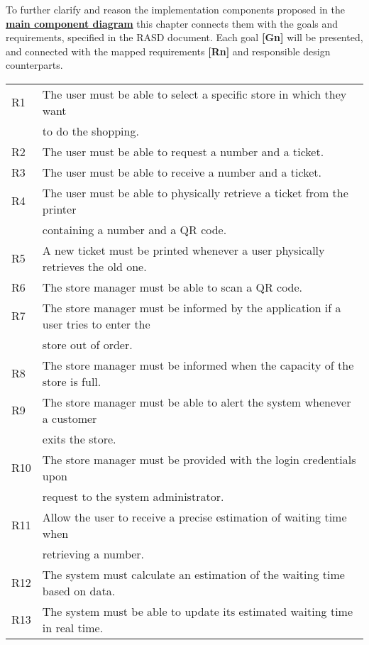 To further clarify and reason the implementation components proposed in the \textbf{\hyperref[fig:componentdiagram1]{main component diagram}} this chapter connects them with the goals and requirements, specified in the RASD document. Each goal \textbf{[Gn]} will be presented, and connected with the mapped requirements \textbf{[Rn]} and responsible design counterparts.\newline


\begin{table}[H]
\begin{flushleft}
\begin{tabular}{|l|l|}
\hline
R1&The user must be able to select a specific store in which they want \\ & to do the shopping.\\
\hline
R2&The user must be able to request a number and a ticket.\\
\hline
R3&The user must be able to receive a number and a ticket. \\
\hline
R4&The user must be able to physically retrieve a ticket from the printer \\   &  containing a number and a QR code.\\
\hline
R5&A new ticket must be printed whenever a user physically retrieves the old one.\\
\hline
R6&The store manager must be able to scan a QR code.\\
\hline
R7&The store manager must be informed by the application if a user tries to enter the \\ & store out of order.\\
\hline
R8&The store manager must be informed when the capacity of the store is full.\\
\hline
R9&The store manager must be able to alert the system whenever a customer \\ & exits the store.\\
\hline
R10&The store manager must be provided with the login credentials upon \\ & request to the system administrator.\\
\hline
R11&Allow the user to receive a precise estimation of waiting time when \\ &  retrieving a number.\\
\hline
R12&The system must calculate an estimation of the waiting time based on data.\\
\hline
R13&The system must be able to update its estimated waiting time in real time.\\

\end{tabular}
\end{flushleft}
\end{table}
